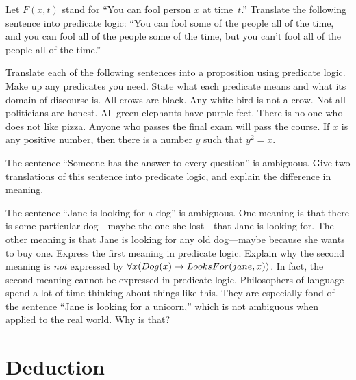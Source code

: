 \begin{exercises}
\problem Let $F(x,t)$ stand for ``You can fool person $x$ at time~$t$.''
Translate the following sentence into predicate logic:
``You can fool some of the people all of the time, and you can fool
all of the people some of the time, but you can't fool all of the
people all of the time.''

\problem Translate each of the following sentences into a proposition 
using predicate logic.  Make up any predicates you need.  State what
each predicate means and what its domain of discourse is.
\ppart All crows are black.
\ppart Any white bird is not a crow.
\ppart Not all politicians are honest.
\ppart All green elephants have purple feet.
\ppart There is no one who does not like pizza.
\ppart Anyone who passes the final exam will pass the course.
\ppart If $x$ is any positive number, then there is a number $y$ such that
$y^2=x$.

\problem The sentence ``Someone has the answer to every question'' is
ambiguous.  Give two translations of this sentence into predicate logic,
and explain the difference in meaning.

\problem The sentence ``Jane is looking for a dog'' is ambiguous.
One meaning is that there is some particular dog---maybe the one she lost---that
Jane is looking for.  The other meaning is that Jane is looking for any old
dog---maybe because she wants to buy one.  Express the first meaning in
predicate logic.  Explain why the second meaning is \emph{not}
expressed by $\forall x(Dog(x)\rightarrow LooksFor(jane,x))$.  In fact, the
second meaning cannot be expressed in predicate logic.  Philosophers
of language spend a lot of time thinking about things like this.
They are especially fond of the sentence ``Jane is looking for a unicorn,''
which is not ambiguous when applied to the real world.  Why is that?



\end{exercises}



\section{Deduction}\label{S-logic-5}


\newcommand{\argument}[2]{
  \begin{tabular}[t]{@{\ }l@{\ }}
   #1\\
   \hline
   $\therefore$\ \ #2\\
  \end{tabular}
}


